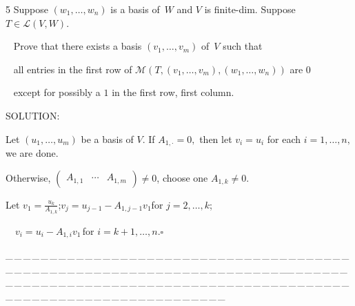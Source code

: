 \documentclass[a4paper, 11pt, UTF8]{article}
\def\Lm{\mathcal{L}}
\def\Mt{\mathcal{M}}
\begin{document}
\begin{large}
{\timesbf\Large 5} {\timessl\Large 
Suppose $(w_1,\dots,w_n)$ is a basis of \,$W$ and $V$ is finite-dim. Suppose $T\in\Lm(V, W)$.}\par\,\,\,
{\timessl\Large Prove that there exists a basis $(v_1,\dots,v_m)$ of \,$V$ such that}\par\,\,\,
{\timessl\Large all entries in the first row of $\Mt(T,(v_1,\dots,v_m),(w_1,\dots,w_n))$ are $0$}\par\,\,\,
{\timessl\Large except for possibly a $1$ in the first row, first column.}\par
{\timesbf S\footnotesize{OLUTION:}}\par\quad
Let $(u_1,\dots,u_m)$ be a basis of $V$. If $A_{1,\cdot}=0,$ then let $v_i=u_i$ for each $i=1,\dots,n,$ we are done.\par\quad
Otherwise, $\begin{pmatrix} A_{1,1} & \cdots & A_{1,m}\end{pmatrix}\neq 0$, choose one $A_{1,k}\neq 0$.\par\quad
Let $v_1=\displaystyle\frac{u_k}{A_{1,k}}$;\qquad$v_j=u_{j-1}-A_{1,j-1}v_1$\quad for $j=2,\dots,k$;\par\quad\qquad\qquad\qquad\quad\,\,\,\,
$v_i=u_i-A_{1,i} v_1$\,\quad\qquad for $i=k+1,\dots,n.$\qquad$\square$
\par
{\tiny \_\,\_\,\_\,\_\,\_\,\_\,\_\,\_\,\_\,\_\,\_\,\_\,\_\,\_\,\_\,\_\,\_\,\_\,\_\,\_\,\_\,\_\,\_\,\_\,\_\,\_\,\_\,\_\,\_\,\_\,\_\,\_\,\_\,\_\,\_\,\_\,\_\,\_\,\_\,\_\,\_\,\_\,\_\,\_\,\_\,\_\,\_\,\_\,\_\,\_\,\_\,\_\,\_\,\_\,\_\,\_\,\_\,\_\,\_\,\_\,\_\,\_\,\_\,\_\,\_\,\_\,\_\,\_\,\_\,\_\,\_\_\,\_\,\_\,\_\,\_\,\_\,\_\,\_\,\_\,\_\,\_\,\_\,\_\,\_\,\_\,\_\,\_\,\_\,\_\,\_\,\_\,\_\,\_\,\_\,\_\,\_\,\_\,\_\,\_\,\_\,\_\,\_\,\_\,\_\,\_\,\_\,\_\,\_\,\_\,\_\,\_\,\_\,\_\,\_\,\_\,\_\,\_\,\_\,\_\,\_\,\_\,\_\,\_\,\_\,\_\,\_\,\_\,\_\,\_\,\_\,\_\,\_\,\_\,\_\,\_\,\_\,\_\,\_\,\_\,\_\,\_}{\tiny\,\par}


\end{large}
\end{document}
